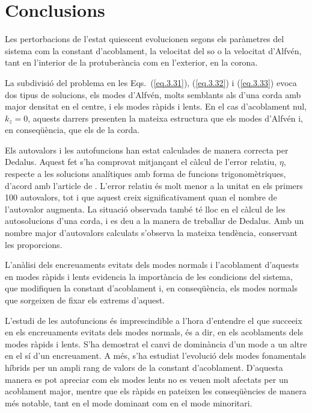 \documentclass[12pt,a4paper]{article}
\numberwithin{equation}{section}
\begin{document}
\clearpage


\section{Conclusions}
Les pertorbacions de l'estat quiescent evolucionen segons els paràmetres del sistema com la constant d'acoblament,
la velocitat del so o la velocitat d'Alfvén, tant en l'interior de la protuberància com en l'exterior, en la corona.

La subdivisió del problema en les Eqs.~(\ref{eq.3.31}), (\ref{eq.3.32}) i (\ref{eq.3.33}) evoca dos tipus de solucions,
els modes d'Alfvén, molts semblants als d'una corda amb major densitat en el centre, i els modes ràpids i lents.
En el cas d'acoblament nul, $k_z = 0$, aquests darrers presenten la mateixa estructura que els modes d'Alfvén i, en conseqüència, que els de la corda.

Els autovalors i les autofuncions han estat calculades de manera correcta per Dedalus.
Aquest fet s'ha comprovat mitjançant el càlcul de l'error relatiu, $\eta$, respecte a les solucions analítiques amb forma de funcions trigonomètriques,
d'acord amb l'article de \textcite{oscillation_modes_II}.
L'error relatiu és molt menor a la unitat en els primers 100 autovalors, tot i que aquest creix significativament quan el nombre de l'autovalor augmenta. 
La situació observada també té lloc en el càlcul de les autosolucions d'una corda, i es deu a la manera de treballar de Dedalus.
Amb un nombre major d'autovalors calculats s'observa la mateixa tendència, conservant les proporcions.

L'anàlisi dels encreuaments evitats dels modes normals i l'acoblament d'aquests en modes ràpids i lents evidencia la importància de les condicions del sistema,
que modifiquen la constant d'acoblament i, en conseqüència, els modes normals que sorgeixen de fixar els extrems d'aquest.

L'estudi de les autofuncions és imprescindible a l'hora d'entendre el que succeeix en els encreuaments evitats dels modes normals,
és a dir, en els acoblaments dels modes ràpids i lents.
S'ha demostrat el canvi de dominància d'un mode a un altre en el sí d'un encreuament.
A més, s'ha estudiat l'evolució dels modes fonamentals híbrids per un ampli rang de valors de la constant d'acoblament.
D'aquesta manera es pot apreciar com els modes lents no es veuen molt afectats per un acoblament major,
mentre que els ràpids en pateixen les conseqüències de manera més notable, tant en el mode dominant com en el mode minoritari.
\end{document}
